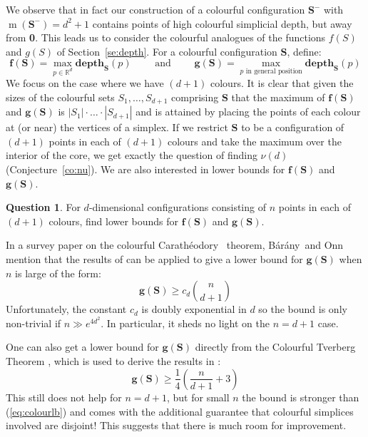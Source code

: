 \documentclass[epsbox,12pt,reqno]{amsart}
\theoremstyle{definition}
\newtheorem{question}[theorem]{Question}
\theoremstyle{remark}
\def\csd{\mathbf{depth}}
\def\S{\mathbf{S}}
\def\f{\mathbf{f}}
\def\g{\mathbf{g}}
\def\bara{B\'ar\'any}
\def\cara{Carath\'eodory}
\def\R{\mathbb{R}}
\def\m{\operatorname{m}}
\def\zero{{\bf 0}}
\begin{document}
We observe that in fact our construction of a colourful
configuration $\S^\minus$ with $\m(\S^\minus)=d^2+1$ contains points of
high colourful simplicial depth, but away from \zero.
This leads us to consider the colourful analogues of the
functions $f(S)$ and $g(S)$ of Section~\ref{se:depth}.
For a colourful configuration $\S$, define:
\begin{equation}\label{eq:fg}
\f(\S)= \max_{p \in \R^d} \csd_\S(p) \qquad \text{ and } \qquad
\g(\S)= \max_{p \text{ in general position}} \csd_\S(p)
\end{equation}
We focus on the case where we have $(d+1)$ colours.
It is clear that given the sizes of the colourful sets 
$S_1,\ldots,S_{d+1}$ comprising $\S$ that the maximum of 
$\f(\S)$ and $\g(\S)$ is $|S_1| \cdot \ldots \cdot |S_{d+1}|$
and is attained by placing the points of each colour at
(or near) the vertices of a simplex.  
If we restrict $\S$ to be a configuration of $(d+1)$ points in 
each of $(d+1)$ colours and take the maximum over the interior of the core, we
get exactly the question of finding $\nu(d)$
(Conjecture~\ref{co:nu}).
We are also interested in lower bounds for $\f(\S)$ and $\g(\S)$.
\begin{question}\label{q:minmax}
For $d$-dimensional configurations consisting of $n$ points in each of 
$(d+1)$ colours, find lower bounds for $\f(\S)$ and $\g(\S)$.
\end{question}

In a survey paper on the colourful \cara~ theorem,
\bara~and Onn \cite{BO97b}
mention that the results of \cite{ABFK92} can be applied to give
a lower bound for $\g(\S)$ when $n$ is large of the form:
\begin{equation}\label{eq:colourlb}
\g(\S) \ge c_d \binom{n}{d+1}
\end{equation}
Unfortunately, the constant $c_d$ is doubly exponential in $d$
so the bound is only non-trivial if $n \gg e^{4d^2}$.  
In particular, it sheds no light on the $n=d+1$ case.

One can also get a lower bound for $\g(\S)$ directly from the
Colourful Tverberg Theorem \cite{ZV92}, which is used to derive the 
results in \cite{ABFK92}:
\begin{equation}\label{eq:tverlb}
\g(\S) \ge \frac{1}{4}\left(\frac{n}{d+1} +3\right)
\end{equation}
This still does not help for $n=d+1$, but 
for small $n$ the bound is stronger than (\ref{eq:colourlb})
and comes with the additional guarantee that colourful
simplices involved are disjoint!  This suggests that there is
much room for improvement.  
\end{document}

